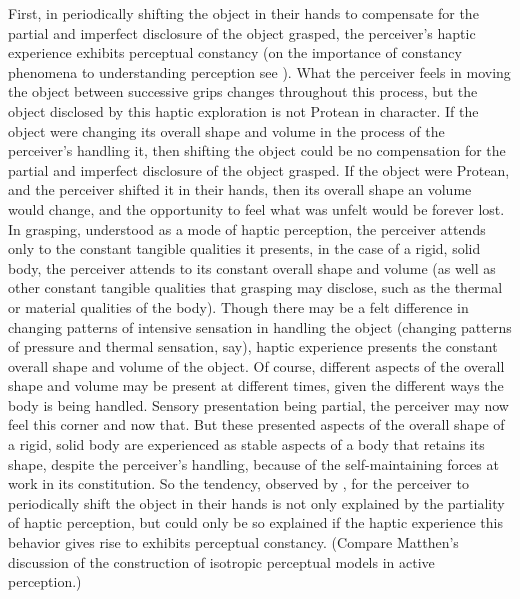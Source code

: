First, in periodically shifting the object in their hands to compensate for the partial and imperfect disclosure of the object grasped, the perceiver's haptic experience exhibits perceptual constancy (on the importance of constancy phenomena to understanding perception see \citealt{Smith:2002sa,Burge:2010uq}). What the perceiver feels in moving the object between successive grips changes throughout this process, but the object disclosed by this haptic exploration is not Protean in character. If the object were changing its overall shape and volume in the process of the perceiver's handling it, then shifting the object could be no compensation for the partial and imperfect disclosure of the object grasped. If the object were Protean, and the perceiver shifted it in their hands, then its overall shape an volume would change, and the opportunity to feel what was unfelt would be forever lost. In grasping, understood as a mode of haptic perception, the perceiver attends only to the constant tangible qualities it presents, in the case of a rigid, solid body, the perceiver attends to its constant overall shape and volume (as well as other constant tangible qualities that grasping may disclose, such as the thermal or material qualities of the body). Though there may be a felt difference in changing patterns of intensive sensation in handling the object  (changing patterns of pressure and thermal sensation, say), haptic experience presents the constant overall shape and volume of the object. Of course, different aspects of the overall shape and volume may be present at different times, given the different ways the body is being handled. Sensory presentation being partial, the perceiver may now feel this corner and now that. But these presented aspects of the overall shape of a rigid, solid body are experienced as stable aspects of a body that retains its shape, despite the perceiver's handling, because of the self-maintaining forces at work in its constitution. So the tendency, observed by \citet{Lederman:1987fr}, for the perceiver to periodically shift the object in their hands is not only explained by the partiality of haptic perception, but could only be so explained if the haptic experience this behavior gives rise to exhibits perceptual constancy. (Compare Matthen's \citeyear{Matthen:2015bq} discussion of the construction of isotropic perceptual models in active perception.)

